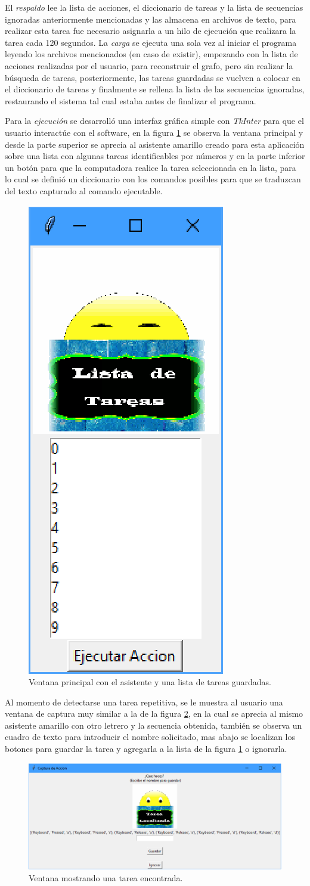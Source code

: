 El \emph{respaldo} lee la lista de acciones, el diccionario de tareas y la lista de secuencias ignoradas anteriormente mencionadas y las almacena en archivos de texto, para realizar esta tarea fue necesario asignarla a un hilo de ejecuci\'on que realizara la tarea cada 120 segundos. La \emph{carga} se ejecuta una sola vez al iniciar el programa leyendo los archivos mencionados (en caso de existir), empezando con la lista de acciones realizadas por el usuario, para reconstruir el grafo, pero sin realizar la b\'usqueda de tareas, posteriormente, las tareas guardadas se vuelven a colocar en el diccionario de tareas y finalmente se rellena la lista de las secuencias ignoradas, restaurando el sistema tal cual estaba antes de finalizar el programa.


Para la \emph{ejecuci\'on} se desarroll\'o una interfaz gr\'afica simple con \emph{TkInter} para que el usuario interact\'ue con el software, en la figura \ref{fig:v01} se observa la ventana principal y desde la parte superior se aprecia al asistente amarillo creado para esta aplicaci\'on sobre una lista con algunas tareas identificables por n\'umeros y en la parte inferior un bot\'on para que la computadora realice la tarea seleccionada en la lista, para lo cual se defini\'o un diccionario con los comandos posibles para que se traduzcan del texto capturado al comando ejecutable. 


\begin{figure}[h]
\centering
\includegraphics[width=0.2\columnwidth]{chap4/Imagenes/ventana1.eps}
\caption{Ventana principal con el asistente y una lista de tareas guardadas.}
\label{fig:v01}
\end{figure} 

Al momento de detectarse una tarea repetitiva, se le muestra al usuario una ventana de captura muy similar a la de la figura \ref{fig:v02}, en la cual se aprecia al mismo asistente amarillo con otro letrero y la secuencia obtenida, tambi\'en se observa un cuadro de texto para introducir el nombre solicitado, mas abajo se localizan los botones para guardar la tarea y agregarla a la lista de la figura \ref{fig:v01} o ignorarla.


\begin{figure}[h]
\centering
\includegraphics[width=0.9\columnwidth]{chap4/Imagenes/ventana2.eps}
\caption{Ventana mostrando una tarea encontrada.}
\label{fig:v02}
\end{figure}

